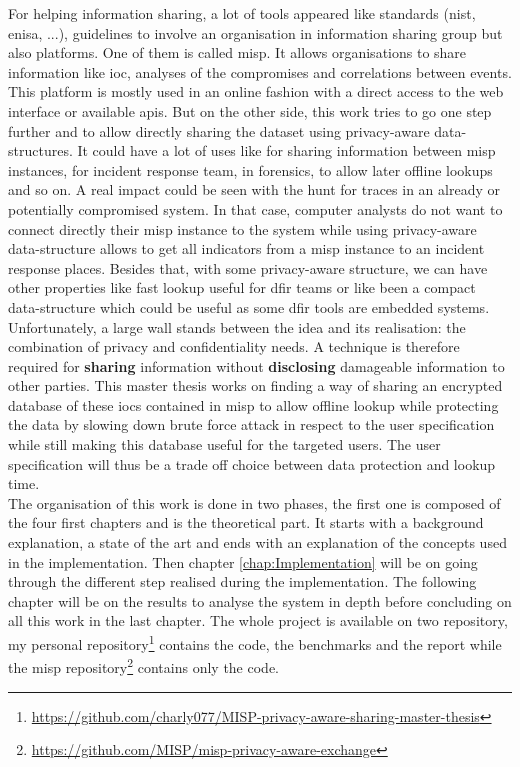 \documentclass{eplmastersthesis}
\begin{document}
For helping information sharing, a lot of tools appeared like standards (\gls{nist}, \gls{enisa}, ...), guidelines to involve an organisation in information sharing group but also platforms. One of them is called \gls{misp}. It allows organisations to share information like \gls{ioc}, analyses of the compromises and correlations between events.
This platform is mostly used in an online fashion with a direct access to the web interface or available \glspl{api}.
But on the other side, this work tries to go one step further and to allow directly sharing the dataset using privacy-aware data-structures. It could have a lot of uses like for sharing information between \gls{misp} instances, for incident response team, in forensics, to allow later offline lookups and so on. A real impact could be seen with the hunt for traces in an already or potentially compromised system. In that case, computer analysts do not want to connect directly their \gls{misp} instance to the system while using privacy-aware data-structure allows to get all indicators from a \gls{misp} instance to an incident response places. Besides that, with some privacy-aware structure, we can have other properties like fast lookup useful for \gls{dfir} teams or like been a compact data-structure which could be useful as some \gls{dfir} tools are embedded systems.
Unfortunately, a large wall stands between the idea and its realisation: the combination of privacy and confidentiality needs.
A technique is therefore required for \textbf{sharing} information without \textbf{disclosing} damageable information to other parties. This master thesis works on finding a way of sharing an encrypted database of these \glspl{ioc} contained in \gls{misp} to allow offline lookup while protecting the data by slowing down brute force attack in respect to the user specification while still making this database useful for the targeted users. The user specification will thus be a trade off choice between data protection and lookup time.\\

The organisation of this work is done in two phases, the first one is composed of the four first chapters and is the theoretical part. It starts with a background explanation, a state of the art and ends with an explanation of the concepts used in the implementation. Then chapter \ref{chap:Implementation} will be on going through the different step realised during the implementation. The following chapter will be on the results to analyse the system in depth before concluding on all this work in the last chapter. The whole project is available on two repository, my personal repository\footnote{\url{https://github.com/charly077/MISP-privacy-aware-sharing-master-thesis}} contains the code, the benchmarks and the report while the \gls{misp} repository\footnote{\url{https://github.com/MISP/misp-privacy-aware-exchange}} contains only the code.
\end{document}
